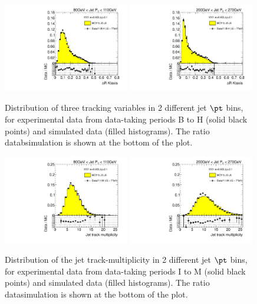 \begin{figure}[tp]
\includegraphics[width=0.49\textwidth]{FIGS/dataMC/VarDRktaxisPT080.pdf}
\includegraphics[width=0.49\textwidth]{FIGS/dataMC/VarDRktaxisPT200.pdf}  
\caption{ Distribution of three tracking variables in 2 different jet $\pt$ bins, for experimental data from data-taking periods B to H (solid black points) and simulated data (filled histograms). The ratio datab\/simulation is shown at the bottom of the plot.}
\label{fig:datamcinputvars}
\end{figure}


\begin{figure}[tp]
\centering
\includegraphics[width=0.49\textwidth]{FIGS/dataMCItoM/VarNtrkPT080.pdf}
\includegraphics[width=0.49\textwidth]{FIGS/dataMCItoM/VarNtrkPT200.pdf}
\caption{ Distribution of the jet track-multiplicity in 2 different jet $\pt$ bins, for experimental data from data-taking periods I to M (solid black points) and simulated data (filled histograms). The ratio data\/simulation is shown at the bottom of the plot.}
\label{fig:datamcinputvarsItoM}
\end{figure}


